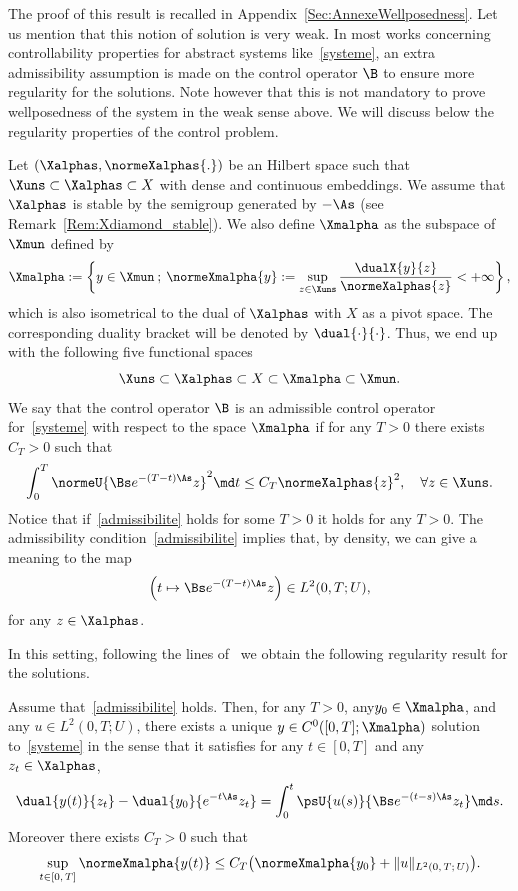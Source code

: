 The proof of this result is recalled in Appendix~\ref{Sec:AnnexeWellposedness}. Let us mention that this notion of solution is very weak. In most works concerning controllability properties for abstract systems like~\eqref{systeme}, an extra admissibility assumption is made on the control operator $\B$ to ensure more regularity for the solutions. Note however that this is not mandatory to prove wellposedness of the system in the weak sense above. We will discuss below the regularity properties of the control problem.

Let $(\Xalphas, \normeXalphas{.})$ be an Hilbert space such that $\Xuns \subset \Xalphas \subset X$ with dense and continuous embeddings. We assume that $\Xalphas$ is stable by the semigroup generated by $-\As$ (see Remark~\ref{Rem:Xdiamond_stable}). We also define $\Xmalpha$ as the subspace of $\Xmun$ defined by
\begin{equation*}\label{Def:X-alpha}
\Xmalpha := \left\{ y \in \Xmun \: ; \: \normeXmalpha{y} := \sup\limits_{z \in \Xuns} \frac{\dualX{y}{z}}{\normeXalphas{z}} < + \infty \right\},
\end{equation*}
which is also isometrical to the dual of $\Xalphas$ with $X$ as a pivot space. The corresponding duality bracket will be denoted by $\dual{\cdot}{\cdot}$. Thus, we end up with the following five functional spaces
\begin{equation*}\label{QuintupleDualite}
\Xuns \subset \Xalphas \subset X \subset \Xmalpha \subset \Xmun.
\end{equation*}
We say that the control operator $\B$ is an admissible control operator for~\eqref{systeme} with respect to the space $\Xmalpha$ if for any $T>0$ there exists $C_T >0$ such that
\begin{equation}\label{admissibilite}
\int_0^T \normeU{\Bs e^{-(T-t)\As} z}^2 \md t \leq C_T \normeXalphas{ z }^2, \quad \forall z \in \Xuns.
\end{equation}
Notice that if~\eqref{admissibilite} holds for some $T>0$ it holds for any $T>0$. The admissibility condition~\eqref{admissibilite} implies that, by density, we can give a meaning to the map
\[
\left(t \mapsto \Bs e^{-(T-t) \As} z \right) \in L^2(0,T ; U),
\]
for any $z\in \Xalphas$.

In this setting, following the lines of~\cite[Theorem~2.37]{CoronBook} we obtain the following regularity result for the solutions.

\begin{prop}\label{Prop:Wellposedness}
Assume that~\eqref{admissibilite} holds. Then, for any $T>0$, any\linebreak$y_0 \in \Xmalpha$, and any $u \in L^2(0,T ; U)$, there exists a unique $y \in C^0([0,T]; \Xmalpha)$ solution to~\eqref{systeme} in the sense that it satisfies for any $t \in [0,T]$ and any $z_t \in \Xalphas$,
\begin{equation*}\label{CaracterisationDualeSolutions}
\dual{y(t)}{z_t} - \dual{y_0}{e^{-t\As} z_t} = \int_0^t \psU{u(s)}{ \Bs e^{-(t-s) \As} z_t} \md s.
\end{equation*}
Moreover there exists $C_T>0$ such that
\[
\sup\limits_{t \in [0,\,T]} \normeXmalpha{y(t)} \leq C_T \big(\normeXmalpha{y_0} + \| u \|_{L^2(0,\,T;\,U)} \big).
\]
\end{prop}

